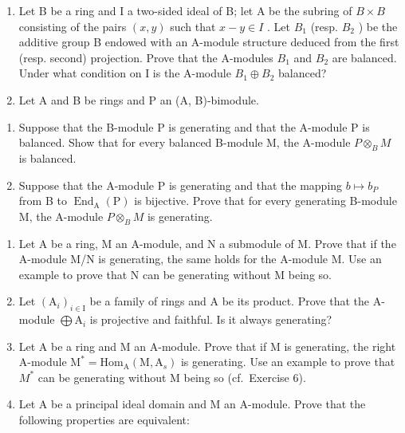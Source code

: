 \begin{enumerate}
\def\labelenumi{\arabic{enumi})}
\setcounter{enumi}{2}
\item
  Let B be a ring and I a two-sided ideal of B; let A be the subring of \(B \times B\) consisting of the pairs \((x, y)\) such that \(x - y \in I\) . Let \(B_{1}\) (resp. \(B_{2}\) ) be the additive group B endowed with an A-module structure deduced from the first (resp. second) projection. Prove that the A-modules \(B_{1}\) and \(B_{2}\) are balanced. Under what condition on I is the A-module \(B_{1} \oplus B_{2}\) balanced?
\item
  Let A and B be rings and P an (A, B)-bimodule.
\end{enumerate}

\begin{enumerate}
\def\labelenumi{\alph{enumi})}
\item
  Suppose that the B-module P is generating and that the A-module P is balanced. Show that for every balanced B-module M, the A-module \(P \otimes_{B} M\) is balanced.
\item
  Suppose that the A-module P is generating and that the mapping \(b \mapsto b_{P}\) from B to \(\operatorname{End}_{\mathrm{A}}(\mathrm{P})\) is bijective. Prove that for every generating B-module M, the A-module \(P \otimes_{B} M\) is generating.
\end{enumerate}

\begin{enumerate}
\def\labelenumi{\arabic{enumi})}
\setcounter{enumi}{4}
\item
  Let A be a ring, M an A-module, and N a submodule of M. Prove that if the A-module M/N is generating, the same holds for the A-module M. Use an example to prove that N can be generating without M being so.
\item
  Let \((\mathrm{A}_i)_{i\in \mathrm{I}}\) be a family of rings and A be its product. Prove that the A-module \(\bigoplus \mathrm{A}_i\) is projective and faithful. Is it always generating?
\item
  Let A be a ring and M an A-module. Prove that if M is generating, the right A-module \(\mathrm{M}^{*} = \mathrm{Hom}_{\mathrm{A}}(\mathrm{M}, \mathrm{A}_{s})\) is generating. Use an example to prove that \(M^{*}\) can be generating without M being so (cf.~Exercise 6).
\item
  Let A be a principal ideal domain and M an A-module. Prove that the following properties are equivalent:
\end{enumerate}

